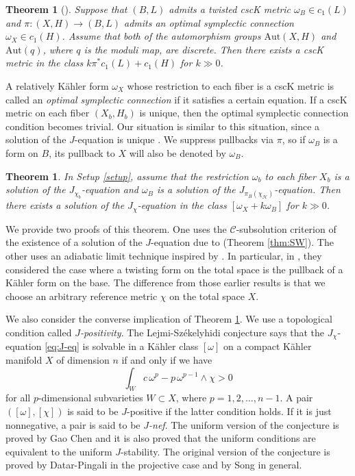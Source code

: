 \documentclass{amsart}
\numberwithin{equation}{section}
\theoremstyle{plain}
\newtheorem{theorem}[equation]{Theorem}
\theoremstyle{definition}
\theoremstyle{remark}
\begin{document}
\begin{theorem}[{\cite[Theorem 1.2]{Dervan-Sektnan}}]\label{thm:DS}
Suppose that $(B, L)$ admits a twisted cscK metric $\omega_B \in c_1(L)$ and $\pi: (X,H) \rightarrow (B,L)$ admits an optimal symplectic connection $\omega_X \in c_1(H)$. Assume that both of the automorphism groups $\mathrm{Aut}(X,H)$ and $\mathrm{Aut}(q)$, where $q$ is the moduli map, are discrete. Then there exists a cscK metric in the class $k\pi^*c_1(L) + c_1(H)$ for $k \gg 0$.
\end{theorem}
A relatively K{\"a}hler form $\omega_X$ whose restriction to each fiber is a cscK metric is called an \textit{optimal symplectic connection} if it satisfies a certain equation. If a cscK metric on each fiber $(X_b, H_b)$ is unique, then the optimal symplectic connection condition becomes trivial. Our situation is similar to this situation, since a solution of the $J$-equation is unique \cite[Proposition 2]{Chen}.
We suppress pullbacks via $\pi$, so if $\omega_B$ is a form on $B$, its pullback to $X$ will also be denoted by $\omega_B$.

\begin{theorem}\label{thm:main}
In Setup \ref{setup}, assume that 
the restriction $\omega_b$ to each fiber $X_b$ is a solution of the $J_{\chi_b}$-equation and   
$\omega_B$ is a solution of the $J_{\pi_B(\chi_\mathcal{H})}$-equation.
Then there exists a solution of the $J_\chi$-equation in the class $[ {\omega_X} + k \omega_B]$ for $k \gg 0$.
\end{theorem}
We provide two proofs of this theorem. One uses the $\mathcal{C}$-subsolution criterion of the existence of a solution of the $J$-equation due to \cite{SW} (Theorem \ref{thm:SW}). The other uses an adiabatic limit technique inspired by \cite{Fine, DS20, Dervan-Sektnan}.
In particular, in \cite[Theorem 1.4]{DS20}, they considered the case where a twisting form on the total space is the pullback of a K{\"a}hler form on the base.  
The difference from those earlier results is that we choose an arbitrary reference metric $\chi$ on the total space $X$.

We also consider the converse implication of Theorem \ref{thm:main}. 
We use a topological condition called \textit{$J$-positivity}. 
The Lejmi-Sz{\'e}kelyhidi conjecture \cite{LS} says that the $J_\chi$-equation \eqref{eq:J-eq} is solvable in a K{\"a}hler class $[\omega]$ on a compact K{\"a}hler manifold $X$ of dimension $n$ if and only if we have 
$$ \int_W{ c \, {\omega}^p - p \, {\omega}^{p-1} \wedge \chi} > 0$$
for all $p$-dimensional subvarieties $W \subset X$, where $ p = 1,2, \dots ,n-1$.
A pair $([\omega], [\chi])$ is said to be $J$-positive if the latter condition holds.
If it is just nonnegative, a pair is said to be \textit{$J$-nef}.
The uniform version of the conjecture is proved by Gao Chen \cite{G.Chen} and it is also proved that the uniform conditions are equivalent to the uniform $J$-stability. 
The original version of the conjecture is proved by Datar-Pingali \cite{Datar-Pingali} in the projective case and by Song \cite{Song} in general.
\end{document}
